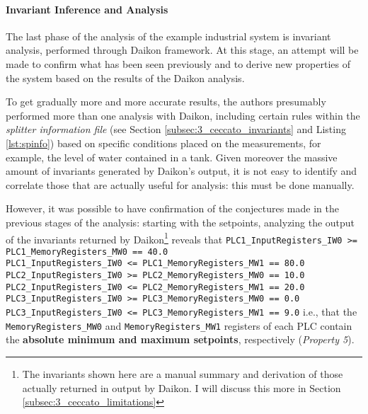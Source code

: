 \paragraph{Invariant Inference and Analysis}
\label{par:3_invariant_appl}
The last phase of the analysis of the example industrial system is invariant analysis, performed through Daikon framework. At this stage, an attempt will be made to confirm what has been seen previously and to derive new properties of the system based on the results of the Daikon analysis.

\bigskip
To get gradually more and more accurate results, the authors presumably performed more than one analysis with Daikon, including certain rules within the \textit{splitter information file} (see Section \ref{subsec:3_ceccato_invariants} and Listing \ref{lst:spinfo}) based on specific conditions placed on the measurements, for example, the level of water contained in a tank. Given moreover the massive amount of invariants generated by Daikon's output, it is not easy to identify and correlate those that are actually useful for analysis: this must be done manually.

\bigskip
However, it was possible to have confirmation of the conjectures made in the previous stages of the analysis: starting with the setpoints, analyzing the output of the invariants returned by Daikon\footnote{The invariants shown here are a manual summary and derivation of those actually returned in output by Daikon. I will discuss this more in Section \ref{subsec:3_ceccato_limitations}} reveals that \newline \newline
\small\texttt{PLC1\_InputRegisters\_IW0 >= PLC1\_MemoryRegisters\_MW0 == 40.0}\\
\texttt{PLC1\_InputRegisters\_IW0 <= PLC1\_MemoryRegisters\_MW1 == 80.0}\\
\texttt{PLC2\_InputRegisters\_IW0 >= PLC2\_MemoryRegisters\_MW0 == 10.0}\\
\texttt{PLC2\_InputRegisters\_IW0 <= PLC2\_MemoryRegisters\_MW1 == 20.0}\\
\texttt{PLC3\_InputRegisters\_IW0 >= PLC3\_MemoryRegisters\_MW0 == 0.0}\\
\texttt{PLC3\_InputRegisters\_IW0 <= PLC3\_MemoryRegisters\_MW1 == 9.0} \newline \newline
\normalsize i.e., that the \texttt{MemoryRegisters\_MW0} and \texttt{MemoryRegisters\_MW1} registers of each PLC contain the \textbf{absolute minimum and maximum setpoints}, respectively (\textit{Property 5}).

